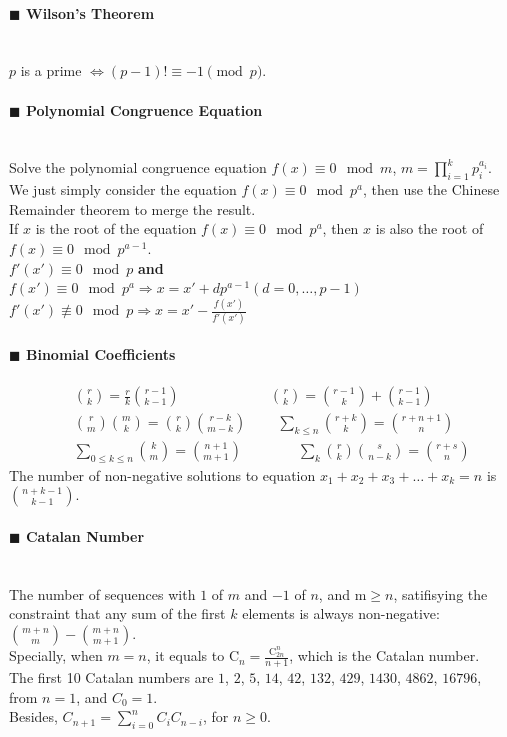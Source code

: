 \documentclass[10pt]{article}
\begin{document}
{\paragraph{$\blacksquare$ Wilson's Theorem}
\noindent \\
$p$ is a prime $\iff (p-1)! \equiv -1 \pmod{p}$.
\paragraph{$\blacksquare$ Polynomial Congruence Equation}
\noindent \\
Solve the polynomial congruence equation $f(x)\equiv 0 \mod m$, $m=\prod_{i=1}^{k}p_i^{a_i}$. \\
We just simply consider the equation $f(x)\equiv 0 \mod p^a$, then use the Chinese Remainder theorem to merge the result. \\
If $x$ is the root of the equation $f(x)\equiv 0 \mod p^a$, then $x$ is also the root of $f(x)\equiv 0 \mod p^{a-1}$. \\
$f'(x')\equiv 0 \mod p$ \textbf{and} $f(x')\equiv 0 \mod p^a \Rightarrow x=x'+dp^{a-1}(d=0,\ldots ,p-1)$ \\
$f'(x')\not\equiv 0 \mod p \Rightarrow x=x'-\frac{f(x')}{f'(x')}$
\paragraph{$\blacksquare$ Binomial Coefficients}
\begin{eqnarray*}
&& \binom{r}{k}=\frac{r}{k}\binom{r-1}{k-1}\qquad \qquad\qquad \: \: \binom{r}{k}=\binom{r-1}{k}+\binom{r-1}{k-1} \\
&& \binom{r}{m}\binom{m}{k}=\binom{r}{k}\binom{r-k}{m-k}\qquad \: \sum_{k\le n}\binom{r+k}{k}=\binom{r+n+1}{n} \\
&& \sum_{0 \le k \le n}\binom{k}{m}=\binom{n+1}{m+1}\qquad\qquad \sum_{k}\binom{r}{k}\binom{s}{n-k}=\binom{r+s}{n}
\end{eqnarray*}
The number of non-negative solutions to equation $x_1 + x_2 + x_3 + \ldots + x_k = n$ is $\binom{n+k-1}{k-1}$.
\paragraph{$\blacksquare$ Catalan Number}
\noindent \\
The number of sequences with $1$ of $m$ and $-1$ of $n$, and m$\ge n$, satifisying the constraint that any sum of the first $k$ elements is always non-negative: $\binom{m+n}{m}-\binom{m+n}{m+1}$. \\
Specially, when $m=n$, it equals to $\mathrm{C}_{n}=\frac{\mathrm{C}_{2n}^{n}}{n+1}$, which is the Catalan number. \\
The first 10 Catalan numbers are $1$, $2$, $5$, $14$, $42$, $132$, $429$, $1430$, $4862$, $16796$, from $n=1$, and $C_0=1$. \\
Besides, $C_{n+1}=\sum_{i=0}^{n}C_{i}C_{n-i}$, for $n\ge 0$.
}
\end{document}

